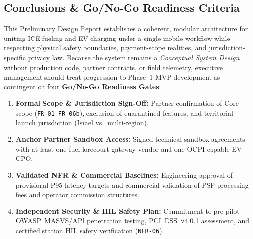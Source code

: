 \subsection{Conclusions \& Go/No-Go Readiness Criteria}
This Preliminary Design Report establishes a coherent, modular architecture for uniting ICE fueling and EV charging under a single mobile workflow while respecting physical safety boundaries, payment-scope realities, and jurisdiction-specific privacy law. Because the system remains a \emph{Conceptual System Design} without production code, partner contracts, or field telemetry, executive management should treat progression to Phase~1 MVP development as contingent on four \textbf{Go/No-Go Readiness Gates}:
\begin{enumerate}[leftmargin=14pt, itemsep=2pt, topsep=2pt]
  \item \textbf{Formal Scope \& Jurisdiction Sign-Off:} Partner confirmation of Core scope (\texttt{FR-01}--\texttt{FR-06b}), exclusion of quarantined features, and territorial launch jurisdiction (Israel vs.\ multi-region).
  \item \textbf{Anchor Partner Sandbox Access:} Signed technical sandbox agreements with at least one fuel forecourt gateway vendor and one OCPI-capable EV CPO.
  \item \textbf{Validated NFR \& Commercial Baselines:} Engineering approval of provisional P95 latency targets and commercial validation of PSP processing fees and operator commission structures.
  \item \textbf{Independent Security \& HIL Safety Plan:} Commitment to pre-pilot OWASP~MASVS/API penetration testing, PCI~DSS~v4.0.1 assessment, and certified station HIL safety verification (\texttt{NFR-06}).
\end{enumerate}

